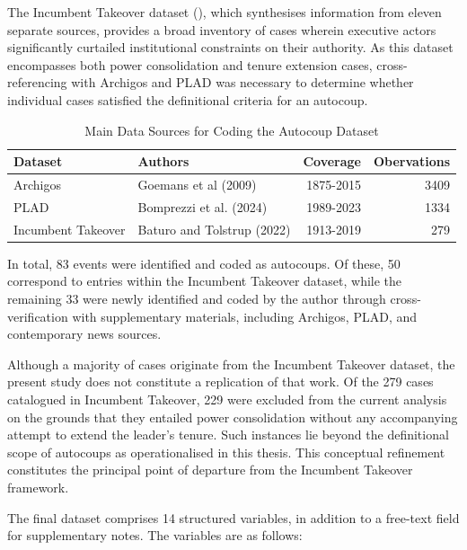 \documentclass[
  12pt,
]{report}
\begin{document}
The Incumbent Takeover dataset (), which synthesises information from eleven separate
sources, provides a broad inventory of cases wherein executive actors
significantly curtailed institutional constraints on their authority. As
this dataset encompasses both power consolidation and tenure extension
cases, cross-referencing with Archigos and PLAD was necessary to
determine whether individual cases satisfied the definitional criteria
for an autocoup.

\begin{longtable}[]{@{}llrr@{}}

\caption{\label{tbl-source}Main Data Sources for Coding the Autocoup
Dataset}

\tabularnewline

\toprule\noalign{}
Dataset & Authors & Coverage & Obervations \\
\midrule\noalign{}
\endhead
\bottomrule\noalign{}
\endlastfoot
Archigos & Goemans et al (2009) & 1875-2015 & 3409 \\
PLAD & Bomprezzi et al. (2024) & 1989-2023 & 1334 \\
Incumbent Takeover & Baturo and Tolstrup (2022) & 1913-2019 & 279 \\

\end{longtable}

In total, 83 events were identified and coded as autocoups. Of these, 50
correspond to entries within the Incumbent Takeover dataset, while the
remaining 33 were newly identified and coded by the author through
cross-verification with supplementary materials, including Archigos,
PLAD, and contemporary news sources.

Although a majority of cases originate from the Incumbent Takeover
dataset, the present study does not constitute a replication of that
work. Of the 279 cases catalogued in Incumbent Takeover, 229 were
excluded from the current analysis on the grounds that they entailed
power consolidation without any accompanying attempt to extend the
leader's tenure. Such instances lie beyond the definitional scope of
autocoups as operationalised in this thesis. This conceptual refinement
constitutes the principal point of departure from the Incumbent Takeover
framework.

The final dataset comprises 14 structured variables, in addition to a
free-text field for supplementary notes. The variables are as follows:
\end{document}
